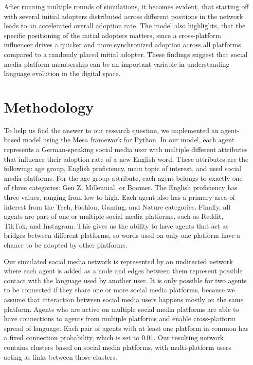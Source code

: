 \documentclass[12pt]{article}
\begin{document}
After running multiple rounds of simulations, it becomes evident, that starting off with several initial adopters distributed across different positions in the network leads to an accelerated overall adoption rate. The model also highlights, that the specific positioning of the initial adopters matters, since a cross-platform influencer drives a quicker and more synchronized adoption across all platforms compared to a randomly placed initial adopter. These findings suggest that social media platform membership can be an important variable in understanding language evolution in the digital space. 


\section{Methodology}

To help us find the answer to our research question, we implemented an agent-based model using the Mesa framework for Python. In our model, each agent represents a German-speaking social media user with multiple different attributes that influence their adoption rate of a new English word. These attributes are the following: age group, English proficiency, main topic of interest, and used social media platforms. For the age group attribute, each agent belongs to exactly one of three categories: Gen Z, Millennial, or Boomer. The English proficiency has three values, ranging from low to high. Each agent also has a primary area of interest from the Tech, Fashion, Gaming, and Nature categories. Finally, all agents are part of one or multiple social media platforms, such as Reddit, TikTok, and Instagram. This gives us the ability to have agents that act as bridges between different platforms, so words used on only one platform have a chance to be adopted by other platforms.

Our simulated social media network is represented by an undirected network where each agent is added as a node and edges between them represent possible contact with the language used by another user. It is only possible for two agents to be connected if they share one or more social media platforms, because we assume that interaction between social media users happens mostly on the same platform. Agents who are active on multiple social media platforms are able to have connections to agents from multiple platforms and enable cross-platform spread of language. Each pair of agents with at least one platform in common has a fixed connection probability, which is set to 0.01. Our resulting network contains clusters based on social media platforms, with multi-platform users acting as links between those clusters.    
\end{document}
